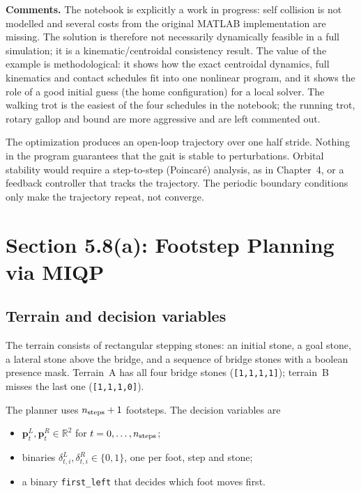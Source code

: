 \documentclass[11pt]{article}
\newcommand{\bp}{\mathbf{p}}
\begin{document}
\textbf{Comments.}  The notebook is explicitly a work in progress: self
collision is not modelled and several costs from the original MATLAB
implementation are missing.  The solution is therefore not necessarily
dynamically feasible in a full simulation; it is a kinematic/centroidal
consistency result.  The value of the example is methodological: it shows how
the exact centroidal dynamics, full kinematics and contact schedules fit into
one nonlinear program, and it shows the role of a good initial guess (the home
configuration) for a local solver.  The walking trot is the easiest of the four
schedules in the notebook; the running trot, rotary gallop and bound are more
aggressive and are left commented out.

\begin{pitfall}[breakable=false,title={A feasible NLP solution is not a stable gait}]
The optimization produces an open-loop trajectory over one half stride.  Nothing
in the program guarantees that the gait is stable to perturbations.  Orbital
stability would require a step-to-step (Poincar\'e) analysis, as in
Chapter~4, or a feedback controller that tracks the trajectory.  The periodic
boundary conditions only make the trajectory repeat, not converge.
\end{pitfall}

\section{Section 5.8(a): Footstep Planning via MIQP}

\subsection{Terrain and decision variables}

The terrain consists of rectangular stepping stones: an initial stone, a goal
stone, a lateral stone above the bridge, and a sequence of bridge stones with
a boolean presence mask.  Terrain~A has all four bridge stones
(\texttt{[1,1,1,1]}); terrain~B misses the last one (\texttt{[1,1,1,0]}).

The planner uses $n_{\rm steps}+1$ footsteps.  The decision variables are
\begin{itemize}[leftmargin=1.5em]
  \item $\bp^{L}_t,\bp^{R}_t\in\mathbb{R}^2$ for $t=0,\dots,n_{\rm steps}$;
  \item binaries $\delta^{L}_{t,i},\delta^{R}_{t,i}\in\{0,1\}$, one per foot,
        step and stone;
  \item a binary \texttt{first\_left} that decides which foot moves first.
\end{itemize}
\end{document}
